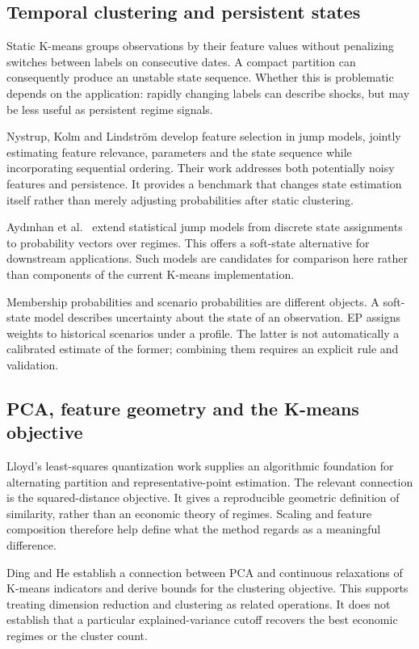\documentclass[11pt,a4paper]{article}
\begin{document}
\subsection{Temporal clustering and persistent states}

Static K-means groups observations by their feature values without penalizing switches between labels on consecutive dates. A compact partition can consequently produce an unstable state sequence. Whether this is problematic depends on the application: rapidly changing labels can describe shocks, but may be less useful as persistent regime signals.

Nystrup, Kolm and Lindstr\"om \cite{nystrup2021} develop feature selection in jump models, jointly estimating feature relevance, parameters and the state sequence while incorporating sequential ordering. Their work addresses both potentially noisy features and persistence. It provides a benchmark that changes state estimation itself rather than merely adjusting probabilities after static clustering.

Ayd{\i}nhan et al.\ \cite{aydinhan2024} extend statistical jump models from discrete state assignments to probability vectors over regimes. This offers a soft-state alternative for downstream applications. Such models are candidates for comparison here rather than components of the current K-means implementation.

Membership probabilities and scenario probabilities are different objects. A soft-state model describes uncertainty about the state of an observation. EP assigns weights to historical scenarios under a profile. The latter is not automatically a calibrated estimate of the former; combining them requires an explicit rule and validation.

\subsection{PCA, feature geometry and the K-means objective}

Lloyd's least-squares quantization work \cite{lloyd1982} supplies an algorithmic foundation for alternating partition and representative-point estimation. The relevant connection is the squared-distance objective. It gives a reproducible geometric definition of similarity, rather than an economic theory of regimes. Scaling and feature composition therefore help define what the method regards as a meaningful difference.

Ding and He \cite{dinghe2004} establish a connection between PCA and continuous relaxations of K-means indicators and derive bounds for the clustering objective. This supports treating dimension reduction and clustering as related operations. It does not establish that a particular explained-variance cutoff recovers the best economic regimes or the cluster count.
\end{document}
